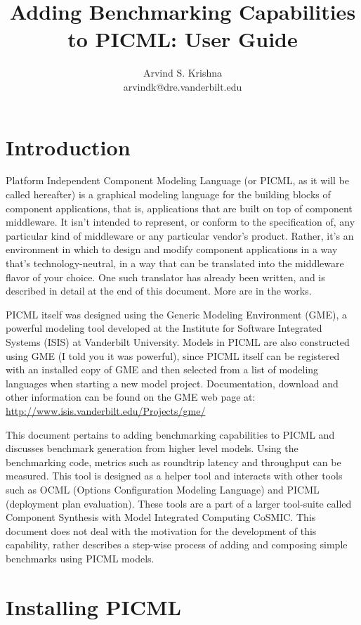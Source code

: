 \documentclass[onecolumn]{article}
\title{\Large\bf
\vspace{-0.5in}
Adding Benchmarking Capabilities to PICML: User Guide
}
\author{
Arvind S. Krishna\\
\normalsize{arvindk@dre.vanderbilt.edu}\\
}
\date{}
\begin{document}
\maketitle

\section*{Introduction}

Platform Independent Component Modeling Language (or PICML, as it will
be called hereafter) is a graphical modeling language for the building
blocks of component applications, that is, applications that are built
on top of component middleware. It isn't intended to represent, or
conform to the specification of, any particular kind of middleware or
any particular vendor's product. Rather, it's an environment in which
to design and modify component applications in a way that's
technology-neutral, in a way that can be translated into the
middleware flavor of your choice. One such translator has already been
written, and is described in detail at the end of this document. More
are in the works.

PICML itself was designed using the Generic Modeling Environment
(GME), a powerful modeling tool developed at the Institute for
Software Integrated Systems (ISIS) at Vanderbilt University. Models in
PICML are also constructed using GME (I told you it was powerful),
since PICML itself can be registered with an installed copy of GME and
then selected from a list of modeling languages when starting a new
model project. Documentation, download and other information can be
found on the GME web page at:
\url{http://www.isis.vanderbilt.edu/Projects/gme/}

This document pertains to adding benchmarking capabilities to PICML
and discusses benchmark generation from higher level models. Using the
benchmarking code, metrics such as roundtrip latency and throughput
can be measured. This tool is designed as a helper tool and interacts
with other tools such as OCML (Options Configuration Modeling
Language) and PICML (deployment plan evaluation).  These tools are a
part of a larger tool-suite called Component Synthesis with Model
Integrated Computing CoSMIC. This document does not deal with the
motivation for the development of this capability, rather describes a
step-wise process of adding and composing simple benchmarks using
PICML models.

\section* {Installing PICML}
\end{document}
